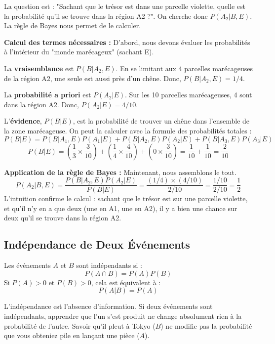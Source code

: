 \begin{intuitionbox}
La question est : "Sachant que le trésor est dans une parcelle violette, quelle est la probabilité qu'il se trouve dans la région A2 ?". On cherche donc $P(A_2 | B, E)$. La règle de Bayes nous permet de le calculer.

\textbf{Calcul des termes nécessaires :} D'abord, nous devons évaluer les probabilités à l'intérieur du "monde marécageux" (sachant E).

La \textbf{vraisemblance} est $P(B|A_2, E)$. En se limitant aux 4 parcelles marécageuses de la région A2, une seule est aussi près d'un chêne. Donc, $P(B|A_2, E) = 1/4$.

La \textbf{probabilité a priori} est $P(A_2|E)$. Sur les 10 parcelles marécageuses, 4 sont dans la région A2. Donc, $P(A_2|E) = 4/10$.

L'\textbf{évidence}, $P(B|E)$, est la probabilité de trouver un chêne dans l'ensemble de la zone marécageuse. On peut la calculer avec la formule des probabilités totales :
$$P(B|E) = P(B|A_1, E)P(A_1|E) + P(B|A_2, E)P(A_2|E) + P(B|A_3, E)P(A_3|E)$$
$$P(B|E) = (\frac{1}{3} \times \frac{3}{10}) + (\frac{1}{4} \times \frac{4}{10}) + (0 \times \frac{3}{10}) = \frac{1}{10} + \frac{1}{10} = \frac{2}{10}$$

\textbf{Application de la règle de Bayes :} Maintenant, nous assemblons le tout.
$$P(A_2|B, E) = \frac{P(B|A_2, E)P(A_2|E)}{P(B|E)} = \frac{(1/4) \times (4/10)}{2/10} = \frac{1/10}{2/10} = \frac{1}{2}$$
L'intuition confirme le calcul : sachant que le trésor est sur une parcelle violette, et qu'il n'y en a que deux (une en A1, une en A2), il y a bien une chance sur deux qu'il se trouve dans la région A2.
\end{intuitionbox}

\subsection{Indépendance de Deux Événements}

\begin{definitionbox}
Les événements $A$ et $B$ sont indépendants si :
$$P(A \cap B) = P(A)P(B)$$
Si $P(A) > 0$ et $P(B) > 0$, cela est équivalent à :
$$P(A|B) = P(A)$$
\end{definitionbox}

\begin{intuitionbox}
L'indépendance est l'absence d'information. Si deux événements sont indépendants, apprendre que l'un s'est produit ne change absolument rien à la probabilité de l'autre. Savoir qu'il pleut à Tokyo ($B$) ne modifie pas la probabilité que vous obteniez pile en lançant une pièce ($A$).
\end{intuitionbox}

